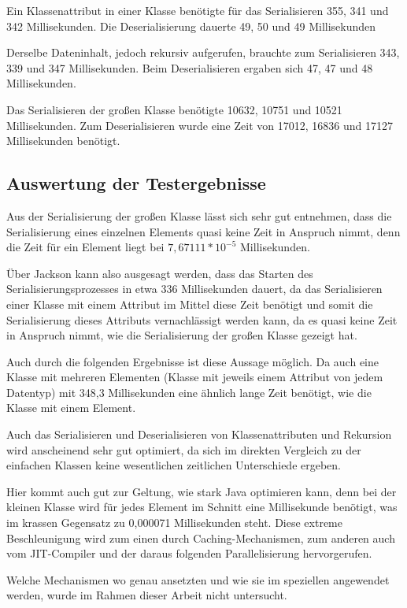 Ein Klassenattribut in einer Klasse ben\"otigte f\"ur das Serialisieren 355, 341 und 342 Millisekunden. Die Deserialisierung dauerte 49, 50 und 49 Millisekunden

Derselbe Dateninhalt, jedoch rekursiv aufgerufen, brauchte zum Serialisieren 343, 339 und 347 Millisekunden. Beim Deserialisieren ergaben sich 47, 47 und 48 Millisekunden.

Das Serialisieren der gro\ss{}en Klasse ben\"otigte 10632, 10751 und 10521 Millisekunden. Zum Deserialisieren wurde eine Zeit von 17012, 16836 und 17127 Millisekunden ben\"otigt.

\subsection{Auswertung der Testergebnisse}
Aus der Serialisierung der gro\ss{}en Klasse l\"asst sich sehr gut entnehmen, dass die Serialisierung eines einzelnen Elements quasi keine Zeit in Anspruch nimmt, denn die Zeit f\"ur ein Element liegt bei $7,67111*10^{-5}$ Millisekunden.

\"Uber Jackson kann also ausgesagt werden, dass das Starten des Serialisierungsprozesses in etwa 336 Millisekunden dauert, da das Serialisieren einer Klasse mit einem Attribut im Mittel diese Zeit ben\"otigt und somit die Serialisierung dieses Attributs vernachl\"assigt werden kann, da es quasi keine Zeit in Anspruch nimmt, wie die Serialisierung der gro\ss{}en Klasse gezeigt hat.

Auch durch die folgenden Ergebnisse ist diese Aussage  m\"oglich. Da auch eine Klasse mit mehreren Elementen (Klasse mit jeweils einem Attribut von jedem Datentyp) mit 348,3 Millisekunden eine \"ahnlich lange Zeit ben\"otigt, wie die Klasse mit einem Element.

Auch das Serialisieren und Deserialisieren von Klassenattributen und Rekursion wird anscheinend sehr gut optimiert, da sich im direkten Vergleich zu der einfachen Klassen keine wesentlichen zeitlichen Unterschiede ergeben.

Hier kommt auch gut zur Geltung, wie stark Java optimieren kann, denn bei der kleinen Klasse wird f\"ur jedes Element im Schnitt eine Millisekunde ben\"otigt, was im krassen Gegensatz zu 0,000071 Millisekunden steht. Diese extreme Beschleunigung wird zum einen durch Caching-Mechanismen, zum anderen auch vom JIT-Compiler und der daraus folgenden Parallelisierung hervorgerufen. 

Welche Mechanismen wo genau ansetzten und wie sie im speziellen angewendet werden, wurde im Rahmen dieser Arbeit nicht untersucht.

